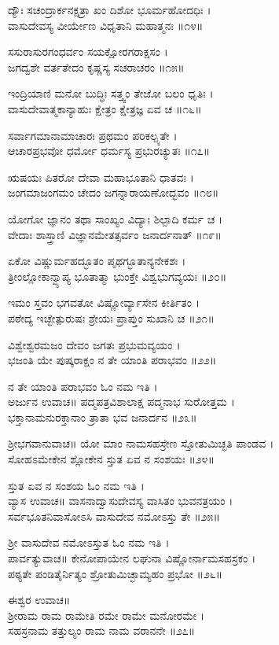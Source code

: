 ದ್ಯೌಃ ಸಚಂದ್ರಾರ್ಕನಕ್ಷತ್ರಾ ಖಂ ದಿಶೋ ಭೂರ್ಮಹೋದಧಿಃ ।\\
ವಾಸುದೇವಸ್ಯ ವೀರ್ಯೇಣ ವಿಧೃತಾನಿ ಮಹಾತ್ಮನಃ ॥೧೪॥

ಸಸುರಾಸುರಗಂಧರ್ವಂ ಸಯಕ್ಷೋರಗರಾಕ್ಷಸಂ ।\\
ಜಗದ್ವಶೇ ವರ್ತತೇದಂ ಕೃಷ್ಣಸ್ಯ ಸಚರಾಚರಂ ॥೧೫॥

ಇಂದ್ರಿಯಾಣಿ ಮನೋ ಬುದ್ಧಿಃ ಸತ್ತ್ವಂ ತೇಜೋ ಬಲಂ ಧೃತಿಃ ।\\
ವಾಸುದೇವಾತ್ಮಕಾನ್ಯಾಹುಃ ಕ್ಷೇತ್ರಂ ಕ್ಷೇತ್ರಜ್ಞ ಏವ ಚ ॥೧೬॥

ಸರ್ವಾಗಮಾನಾಮಾಚಾರಃ ಪ್ರಥಮಂ ಪರಿಕಲ್ಪ್ಯತೇ ।\\
ಆಚಾರಪ್ರಭವೋ ಧರ್ಮೋ ಧರ್ಮಸ್ಯ ಪ್ರಭುರಚ್ಯುತಃ ॥೧೭॥

ಋಷಯಃ ಪಿತರೋ ದೇವಾ ಮಹಾಭೂತಾನಿ ಧಾತವಃ ।\\
ಜಂಗಮಾಜಂಗಮಂ ಚೇದಂ ಜಗನ್ನಾರಾಯಣೋದ್ಭವಂ ॥೧೮॥

ಯೋಗೋ ಜ್ಞಾನಂ ತಥಾ ಸಾಂಖ್ಯಂ ವಿದ್ಯಾಃ ಶಿಲ್ಪಾದಿ ಕರ್ಮ ಚ ।\\
ವೇದಾಃ ಶಾಸ್ತ್ರಾಣಿ ವಿಜ್ಞಾನಮೇತತ್ಸರ್ವಂ ಜನಾರ್ದನಾತ್ ॥೧೯॥

ಏಕೋ ವಿಷ್ಣುರ್ಮಹದ್ಭೂತಂ ಪೃಥಗ್ಭೂತಾನ್ಯನೇಕಶಃ ।\\
ತ್ರೀಂಲ್ಲೋಕಾನ್ವ್ಯಾಪ್ಯ ಭೂತಾತ್ಮಾ ಭುಂಕ್ತೇ ವಿಶ್ವಭುಗವ್ಯಯಃ ॥೨೦॥

ಇಮಂ ಸ್ತವಂ ಭಗವತೋ ವಿಷ್ಣೋರ್ವ್ಯಾಸೇನ ಕೀರ್ತಿತಂ ।\\
ಪಠೇದ್ಯ ಇಚ್ಛೇತ್ಪುರುಷಃ ಶ್ರೇಯಃ ಪ್ರಾಪ್ತುಂ ಸುಖಾನಿ ಚ ॥೨೧॥

ವಿಶ್ವೇಶ್ವರಮಜಂ ದೇವಂ ಜಗತಃ ಪ್ರಭುಮವ್ಯಯಂ ।\\
ಭಜಂತಿ ಯೇ ಪುಷ್ಕರಾಕ್ಷಂ ನ ತೇ ಯಾಂತಿ ಪರಾಭವಂ ॥೨೨॥

ನ ತೇ ಯಾಂತಿ ಪರಾಭವಂ ಓಂ ನಮ ಇತಿ ।\\
ಅರ್ಜುನ ಉವಾಚ॥
ಪದ್ಮಪತ್ರವಿಶಾಲಾಕ್ಷ ಪದ್ಮನಾಭ ಸುರೋತ್ತಮ ।\\
ಭಕ್ತಾನಾಮನುರಕ್ತಾನಾಂ ತ್ರಾತಾ ಭವ ಜನಾರ್ದನ ॥೨೩॥

ಶ್ರೀಭಗವಾನುವಾಚ॥
ಯೋ ಮಾಂ ನಾಮಸಹಸ್ರೇಣ ಸ್ತೋತುಮಿಚ್ಛತಿ ಪಾಂಡವ ।\\
ಸೋಹಽಮೇಕೇನ ಶ್ಲೋಕೇನ ಸ್ತುತ ಏವ ನ ಸಂಶಯಃ ॥೨೪॥

ಸ್ತುತ ಏವ ನ ಸಂಶಯ ಓಂ ನಮ ಇತಿ ।\\
ವ್ಯಾಸ ಉವಾಚ॥
ವಾಸನಾದ್ವಾಸುದೇವಸ್ಯ ವಾಸಿತಂ ಭುವನತ್ರಯಂ ।\\
ಸರ್ವಭೂತನಿವಾಸೋಽಸಿ ವಾಸುದೇವ ನಮೋಽಸ್ತು ತೇ ॥೨೫॥

ಶ್ರೀ ವಾಸುದೇವ ನಮೋಽಸ್ತುತ ಓಂ ನಮ ಇತಿ ।\\
ಪಾರ್ವತ್ಯುವಾಚ॥
ಕೇನೋಪಾಯೇನ ಲಘುನಾ ವಿಷ್ಣೋರ್ನಾಮಸಹಸ್ರಕಂ ।\\
ಪಠ್ಯತೇ ಪಂಡಿತೈರ್ನಿತ್ಯಂ ಶ್ರೋತುಮಿಚ್ಛಾಮ್ಯಹಂ ಪ್ರಭೋ ॥೨೬॥

ಈಶ್ವರ ಉವಾಚ॥\\
ಶ್ರೀರಾಮ ರಾಮ ರಾಮೇತಿ ರಮೇ ರಾಮೇ ಮನೋರಮೇ ।\\
ಸಹಸ್ರನಾಮ ತತ್ತುಲ್ಯಂ ರಾಮ ನಾಮ ವರಾನನೇ ॥೨೭॥


